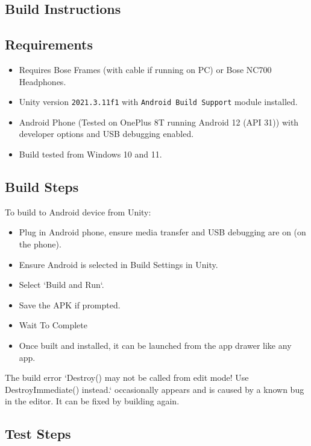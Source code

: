 \documentclass{l4proj}
\begin{document}
\begin{appendices}
\section{Build Instructions}

\subsection{Requirements}
\begin{itemize}
    \item Requires Bose Frames (with cable if running on PC) or Bose NC700 Headphones.
    \item Unity version \texttt{2021.3.11f1} with \texttt{Android Build Support} module installed.
    \item Android Phone (Tested on OnePlus 8T running Android 12 (API 31)) with developer options and USB debugging enabled.
    \item Build tested from Windows 10 and 11.
\end{itemize}

\subsection{Build Steps}

To build to Android device from Unity: \begin{itemize}
    \item Plug in Android phone, ensure media transfer and USB debugging are on (on the phone).
    \item Ensure Android is selected in Build Settings in Unity.
    \item Select `Build and Run`.
    \item Save the APK if prompted.
    \item Wait To Complete
    \item Once built and installed, it can be launched from the app drawer like any app.
\end{itemize}


 The build error `Destroy() may not be called from edit mode! Use DestroyImmediate() instead.` occasionally appears and is caused by a known bug in the editor. It can be fixed by building again.

\subsection{Test Steps}


\end{appendices}
\end{document}
